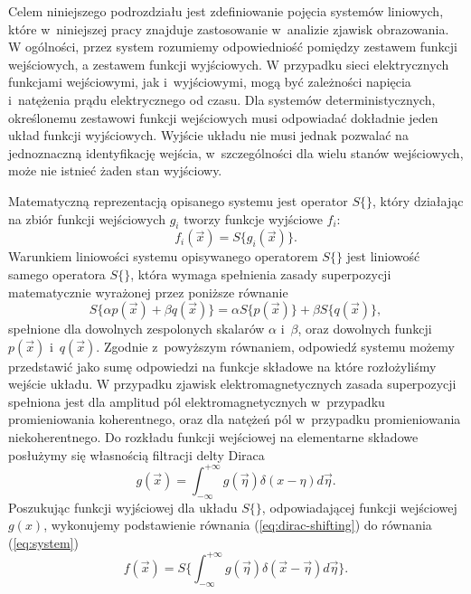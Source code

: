 Celem niniejszego podrozdziału jest zdefiniowanie pojęcia systemów liniowych, które w~niniejszej pracy znajduje zastosowanie w~analizie zjawisk obrazowania. W ogólności, przez system rozumiemy odpowiedniość pomiędzy zestawem funkcji wejściowych, a zestawem funkcji wyjściowych. W przypadku sieci elektrycznych funkcjami wejściowymi, jak i~wyjściowymi, mogą być zależności napięcia i~natężenia prądu elektrycznego od czasu. Dla systemów deterministycznych, określonemu zestawowi funkcji wejściowych musi odpowiadać dokładnie jeden układ funkcji wyjściowych. Wyjście układu nie musi jednak pozwalać na jednoznaczną identyfikację wejścia, w~szczególności dla wielu stanów wejściowych, może nie istnieć żaden stan wyjściowy.
\label{art:lsi}

Matematyczną reprezentacją opisanego systemu jest operator $S\{\}$, który działając na zbiór funkcji wejściowych $g_i$ tworzy funkcje wyjściowe $f_i$:
\begin{equation}
f_i(\vec{x})=S\{g_i(\vec{x})\}.
\label{eq:system}
\end{equation} 
Warunkiem liniowości systemu opisywanego operatorem $S\{\}$ jest liniowość samego operatora $S\{\}$, która wymaga spełnienia zasady superpozycji matematycznie wyrażonej przez poniższe równanie
\begin{equation}
S\{\alpha p(\vec{x}) + \beta q(\vec{x})\} = \alpha S\{p(\vec{x})\} + \beta S\{q(\vec{x})\},
\label{eq:lin-system}
\end{equation}
spełnione dla dowolnych zespolonych skalarów $\alpha$ i~$\beta$, oraz dowolnych funkcji $p(\vec{x})$ i~$q(\vec{x})$. Zgodnie z~powyższym równaniem, odpowiedź systemu możemy przedstawić jako sumę odpowiedzi na funkcje składowe na które rozłożyliśmy wejście układu. W przypadku zjawisk elektromagnetycznych zasada superpozycji spełniona jest dla amplitud pól elektromagnetycznych w~przypadku promieniowania koherentnego, oraz dla natężeń pól w~przypadku promieniowania niekoherentnego. Do rozkładu funkcji wejściowej na elementarne składowe posłużymy się własnością filtracji delty Diraca
\begin{equation}
g(\vec{x})=\int_{-\infty}^{+\infty} g(\vec{\eta}) \delta(x-\eta) d \vec{\eta}.
\label{eq:dirac-shifting}
\end{equation}
Poszukując funkcji wyjściowej dla układu $S\{\}$, odpowiadającej funkcji wejściowej $g(x)$, wykonujemy podstawienie równania (\ref{eq:dirac-shifting}) do równania (\ref{eq:system}) 
\begin{equation}
f(\vec{x})=S \Bigg\{\int_{-\infty}^{+\infty} g(\vec{\eta}) \delta(\vec{x}-\vec{\eta}) d \vec{\eta} \Bigg\}.
\label{eq:dirac-shift2}
\end{equation}
